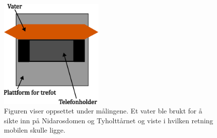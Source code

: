  
\begin{figure}
    \centering
    \includegraphics[width=0.45\textwidth]{img/Plattform med vater.pdf}
    \caption{Figuren viser oppsettet under målingene. Et vater ble brukt for å sikte inn på Nidarosdomen og Tyholttårnet og viste i hvilken retning mobilen skulle ligge. 
        }
    \label{fig:med_vater}
\end{figure}